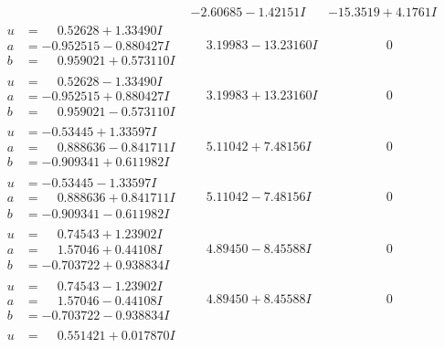 \documentclass[1p]{elsarticle_modified}
\theoremstyle{definition}
\begin{document}
$$\begin{array}{c|c|c}
 & -2.60685 - 1.42151 I & -15.3519 + 4.1761 I \\ \hline\begin{aligned}
u &= \phantom{-}0.52628 + 1.33490 I \\
a &= -0.952515 - 0.880427 I \\
b &= \phantom{-}0.959021 + 0.573110 I\end{aligned}
 & \phantom{-}3.19983 - 13.23160 I & \phantom{-0.000000 } 0 \\ \hline\begin{aligned}
u &= \phantom{-}0.52628 - 1.33490 I \\
a &= -0.952515 + 0.880427 I \\
b &= \phantom{-}0.959021 - 0.573110 I\end{aligned}
 & \phantom{-}3.19983 + 13.23160 I & \phantom{-0.000000 } 0 \\ \hline\begin{aligned}
u &= -0.53445 + 1.33597 I \\
a &= \phantom{-}0.888636 - 0.841711 I \\
b &= -0.909341 + 0.611982 I\end{aligned}
 & \phantom{-}5.11042 + 7.48156 I & \phantom{-0.000000 } 0 \\ \hline\begin{aligned}
u &= -0.53445 - 1.33597 I \\
a &= \phantom{-}0.888636 + 0.841711 I \\
b &= -0.909341 - 0.611982 I\end{aligned}
 & \phantom{-}5.11042 - 7.48156 I & \phantom{-0.000000 } 0 \\ \hline\begin{aligned}
u &= \phantom{-}0.74543 + 1.23902 I \\
a &= \phantom{-}1.57046 + 0.44108 I \\
b &= -0.703722 + 0.938834 I\end{aligned}
 & \phantom{-}4.89450 - 8.45588 I & \phantom{-0.000000 } 0 \\ \hline\begin{aligned}
u &= \phantom{-}0.74543 - 1.23902 I \\
a &= \phantom{-}1.57046 - 0.44108 I \\
b &= -0.703722 - 0.938834 I\end{aligned}
 & \phantom{-}4.89450 + 8.45588 I & \phantom{-0.000000 } 0 \\ \hline\begin{aligned}
u &= \phantom{-}0.551421 + 0.017870 I \\

\end{aligned}
\end{array}$$
\end{document}
